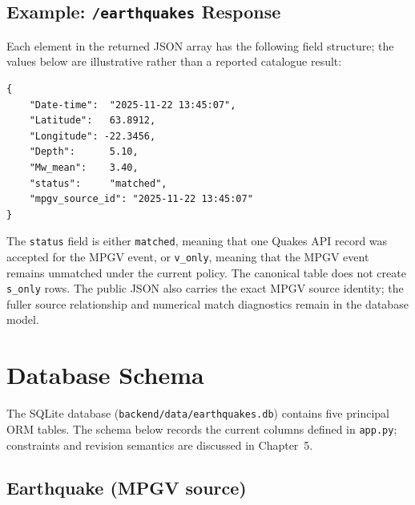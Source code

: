 \documentclass[12pt]{article}
\begin{document}
\subsection*{Example: \texttt{/earthquakes} Response}

Each element in the returned JSON array has the following field structure; the values below are illustrative rather than a reported catalogue result:

\begin{verbatim}
{
    "Date-time":  "2025-11-22 13:45:07",
    "Latitude":   63.8912,
    "Longitude": -22.3456,
    "Depth":      5.10,
    "Mw_mean":    3.40,
    "status":     "matched",
    "mpgv_source_id": "2025-11-22 13:45:07"
}
\end{verbatim}

The \texttt{status} field is either \texttt{matched}, meaning that one Quakes API record was accepted for the MPGV event, or \texttt{v\_only}, meaning that the MPGV event remains unmatched under the current policy. The canonical table does not create \texttt{s\_only} rows. The public JSON also carries the exact MPGV source identity; the fuller source relationship and numerical match diagnostics remain in the database model.

\clearpage
\section{Database Schema}
\label{app:schema}

The SQLite database (\texttt{backend/data/earthquakes.db}) contains five principal ORM tables. The schema below records the current columns defined in \texttt{app.py}; constraints and revision semantics are discussed in Chapter~5.

\subsection*{Earthquake (MPGV source)}
\end{document}
